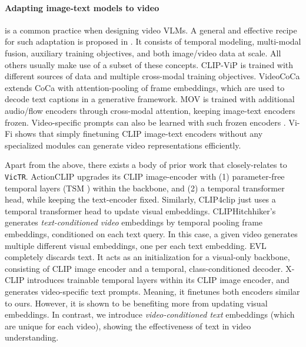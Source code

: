 \documentclass[10pt,twocolumn,letterpaper]{article}
\newcommand{\ours}{\texttt{VicTR}}
\begin{document}
\paragraph{Adapting image-text models to video} is a common practice when designing video VLMs. A general and effective recipe for such adaptation is proposed in \cite{cheng2022vindlu}. It consists of temporal modeling, multi-modal fusion, auxiliary training objectives, and both image/video data at scale. All others usually make use of a subset of these concepts. CLIP-ViP \cite{xue2022clipvip} is trained with different sources of data and multiple cross-modal training objectives. VideoCoCa \cite{yan2022videococa} extends CoCa \cite{yu2022coca} with attention-pooling of frame embeddings, which are used to decode text captions in a generative framework. MOV \cite{qian2022multimodal} is trained with additional audio/flow encoders through cross-modal attention, keeping image-text encoders frozen. Video-specific prompts can also be learned with such frozen encoders \cite{ju2022prompting}. Vi-Fi \cite{rasheed2022fine} shows that simply finetuning CLIP image-text encoders without any specialized modules can generate video representations efficiently.

Apart from the above, there exists a body of prior work that closely-relates to \ours. ActionCLIP \cite{wang2021actionclip} upgrades its CLIP image-encoder with (1) parameter-free temporal layers (TSM \cite{lin2019tsm}) within the backbone, and (2) a temporal transformer head, while keeping the text-encoder fixed. Similarly, CLIP4clip \cite{luo2022clip4clip} just uses a temporal transformer head to update visual embeddings. CLIPHitchhiker's \cite{bain2022cliphitchhiker} generates \textit{text-conditioned video} embeddings by temporal pooling frame embeddings, conditioned on each text query. In this case, a given video generates multiple different visual embeddings, one per each text embedding. EVL \cite{lin2022evl} completely discards text. It acts as an initialization for a visual-only backbone, consisting of CLIP image encoder and a temporal, class-conditioned decoder. X-CLIP \cite{ma2022xclip} introduces trainable temporal layers within its CLIP image encoder, and generates video-specific text prompts. Meaning, it finetunes both encoders similar to ours. However, it is shown to be benefiting more from updating visual embeddings. In contrast, we introduce \textit{video-conditioned text} embeddings (which are unique for each video), showing the effectiveness of text in video understanding.
\end{document}
